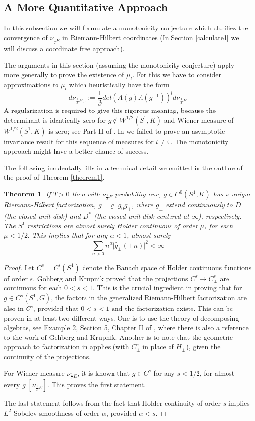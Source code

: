 \documentclass{amsart}
\newtheorem{theorem}{Theorem}[section]
\theoremstyle{conjecture}
\theoremstyle{definition}
\theoremstyle{question}
\theoremstyle{questions}
\theoremstyle{remark}
\theoremstyle{remarks}
\theoremstyle{example}
\numberwithin{equation}{section}
\begin{document}
\subsection{A More Quantitative Approach}

In this subsection we will formulate a monotonicity conjecture which clarifies the convergence of $\nu_{\frac 1T E}$ in Riemann-Hilbert coordinates
(In Section \ref{calculate1} we will discuss a coordinate free approach).

The arguments in this section (assuming the monotonicity conjecture) apply more generally to prove the existence of $\mu_l$. For this we
have to consider approximations to $\mu_l$ which heuristically have the form
$$d\nu_{\frac 1T E,l}:=\frac{1}{\mathfrak Z}det(A(g)A(g^{-1}))^{l}d\nu_{\frac 1T E} $$
A regularization is required to give this rigorous meaning, because the determinant is identically zero for $g \notin W^{1/2}(S^1,K)$ and Wiener measure
of $W^{1/2}(S^1,K)$ is zero; see Part II of \cite{Pi1}. In \cite{Pi1} we failed to prove an asymptotic invariance result for this sequence of measures for $l\ne 0$. The monotonicity approach might have a better chance of success. 

The following incidentally fills in a technical detail we omitted in the outline of the proof of Theorem \ref{theorem1}.

\begin{theorem}\label{1.1.2} If $T>0$ then with $\nu_{\frac 1T E}$ probability one, $g\in
C^0(S^1,K)$
has a unique Riemann-Hilbert factorization, $g=g_{-}g_0g_{+}$,
where $g_{\pm}$ extend continuously to $D$ (the closed unit disk)
and $D^*$ (the closed unit disk centered at $\infty$), respectively. The $S^1$ restrictions are almost surely
Holder continuous of order $\mu$, for each $\mu <1/2$.  This
implies that for any $\alpha <1$, almost surely
$$\sum_{n>0}n^{\alpha}\vert\hat {g}_{\pm}(\pm n)\vert^2<\infty $$
\end{theorem}

\begin{proof}  Let $C^s=C^s(S^1)$ denote the Banach space of Holder continuous functions
of order $s$. Gohberg and Krupnik proved that the projections $C^{s}\to C^{s}_{\pm}$
are continuous for each $0<s<1$.  This is the crucial ingredient in proving that for
$g\in C^{s}(S^1,G)$, the factors in the generalized Riemann-Hilbert
factorization are also in $C^{s}$, provided that $0<s <1$ and the factorization exists. This
can be proven in at least two different ways.  One is to
use the theory of decomposing algebras, see Example 2,
Section 5, Chapter II of \cite{CG}, where there is also a reference to the work of Gohberg and Krupnik.
Another is to note that the
geometric approach to factorization in \cite{PS} applies (with
$C^{s}_{\pm}$ in place of $H_{\pm}$), given the continuity of the
projections.

For Wiener measure $\nu_{\frac 1T E}$, it is known that $g\in C^{s}$ for
any $s <1/2$, for almost every $g$ $[\nu_{\frac 1T E}]$.  This proves the
first statement.

The last statement follows from the fact that Holder
continuity of order $s$ implies $L^2$-Sobolev smoothness of order
$\alpha$, provided $\alpha<s$.  \end{proof}
\end{document}

